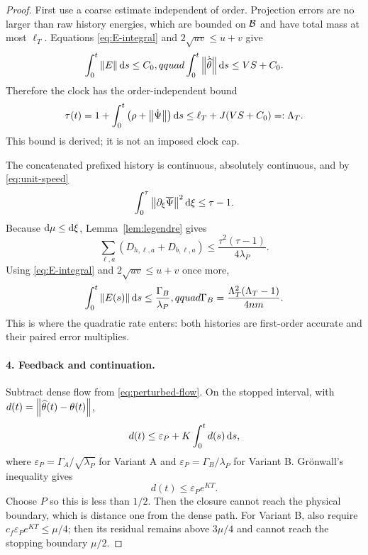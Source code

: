 \begin{proof}
First use a coarse estimate independent of order.  Projection errors are no
larger than raw history energies, which are bounded on $\mathcal B$ and have total
mass at most $\ell_T$.  Equations \eqref{eq:E-integral} and
$2\sqrt{uv}\le u+v$ give
\begin{equation}
 \int_0^t\left\lVert E\right\rVert\mathop{}\!\mathrm d s\le C_0,qquad
 \int_0^t\left\lVert \dot{\widehat\theta}\right\rVert\mathop{}\!\mathrm d s\le VS+C_0.
\end{equation}
Therefore the clock has the order-independent bound
\begin{equation}
 \tau(t)=1+\int_0^t\left(\rho+\left\lVert \dot\Psi\right\rVert\right)\mathop{}\!\mathrm d s
 \le \ell_T+J(VS+C_0)=:\Lambda_T.
 \label{eq:clock-bound}
\end{equation}
This bound is derived; it is not an imposed clock cap.

The concatenated prefixed history is continuous, absolutely continuous, and
by \eqref{eq:unit-speed}
\begin{equation}
 \int_0^\tau\left\lVert \partial_\xi\overline\Psi\right\rVert^2\mathop{}\!\mathrm d\xi\le\tau-1.
\end{equation}
Because $\mathop{}\!\mathrm d\mu\le\mathop{}\!\mathrm d\xi$, Lemma~\ref{lem:legendre} gives
\begin{equation}
 \sum_{\ell,a}\left(D_{h,\ell,a}+D_{b,\ell,a}\right)
 \le\frac{\tau^2(\tau-1)}{4\lambda_P}.
 \label{eq:B-all-D}
\end{equation}
Using \eqref{eq:E-integral} and $2\sqrt{uv}\le u+v$ once more,
\begin{equation}
 \int_0^t\left\lVert E(s)\right\rVert\mathop{}\!\mathrm d s
 \le\frac{\Gamma_B}{\lambda_P},qquad
 \Gamma_B=\frac{\Lambda_T^2(\Lambda_T-1)}{4nm}.
 \label{eq:B-defect}
\end{equation}
This is where the quadratic rate enters: both histories are first-order
accurate and their paired error multiplies.

\paragraph{4. Feedback and continuation.}
Subtract dense flow from \eqref{eq:perturbed-flow}.  On the stopped interval,
with $d(t)=\left\lVert \widehat\theta(t)-\theta(t)\right\rVert$,
\begin{equation}
 d(t)\le\varepsilon_P+K\int_0^t d(s)\mathop{}\!\mathrm d s,
\end{equation}
where $\varepsilon_P=\Gamma_A/\sqrt{\lambda_P}$ for Variant A and
$\varepsilon_P=\Gamma_B/\lambda_P$ for Variant B.  Gr\"onwall's inequality
gives
\begin{equation}
 d(t)\le\varepsilon_Pe^{KT}.
 \label{eq:feedback}
\end{equation}
Choose $P$ so this is less than $1/2$.  Then the closure cannot reach the
physical boundary, which is distance one from the dense path.  For Variant B,
also require $c_f\varepsilon_Pe^{KT}\le\mu/4$; then its residual remains above
$3\mu/4$ and cannot reach the stopping boundary $\mu/2$.


\end{proof}
